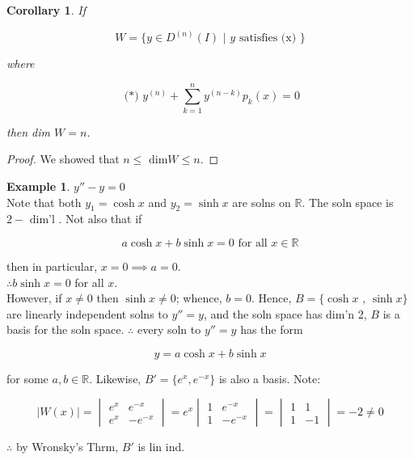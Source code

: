 \documentclass{article}
\newtheorem*{corollary}{Corollary}
\theoremstyle{definition}
\newtheorem*{example}{Example}
\begin{document}
\begin{corollary}
  If 

  \[ W = \{ y \in D^{(n)} (I) \text{ | } y \text{ satisfies (x) } \} \]

  where

  \[ \text{ (*) } y^{(n)} + \sum_{k=1}^n y^{(n-k)} p_k(x) = 0 \]

  then dim \( W = n \).
\end{corollary}

\begin{proof}
  We showed that \( n \leq \text{ dim} W \leq n \).
\end{proof}

\begin{example}
  \( y'' - y = 0 \) \\
  Note that both \( y_1 = \cosh x \) and \( y_2 = \sinh x \) are solns on
  \( \mathbb{R} \). The soln space is \( 2 - \text{ dim'l } \). Not also
  that if 

  \[ a \cosh x + b \sinh x = 0 \text{ for all } x \in \mathbb{R} \]

  then in particular, \( x = 0 \implies a = 0 \).\\
  \( \therefore b \sinh x = 0 \) for all \( x \). \\

  However, if \( x \neq 0 \) then \( \sinh x \neq 0 \); whence, \( b = 0
  \). Hence, \( B = \{ \cosh x \text{ , } \sinh x \} \) are linearly
  independent solns to \( y'' = y \), and the soln space has dim'n 2, \( B
  \) is a basis for the soln space. \( \therefore \) every soln to \( y''
  = y\) has the form 

  \[ y = a \cosh x + b \sinh x \]

  for some \( a, b \in \mathbb{R} \). Likewise, \( B' = \{ e^x, e^{-x} \}
  \) is also a basis. Note:

  \[  |W(x)| = 
  \begin{vmatrix}
    e^x & e^{-x} \\
    e^x & -e^{-x} 
  \end{vmatrix}
  = e^x
  \begin{vmatrix}
    1 & e^{-x} \\
    1 & -e^{-x} 
  \end{vmatrix}
  =
  \begin{vmatrix}
    1 & 1 \\
    1 & -1 
  \end{vmatrix}
  = -2  \neq 0
  \]

  \( \therefore \) by Wronsky's Thrm, \( B' \) is lin ind. 
\end{example}
\end{document}
